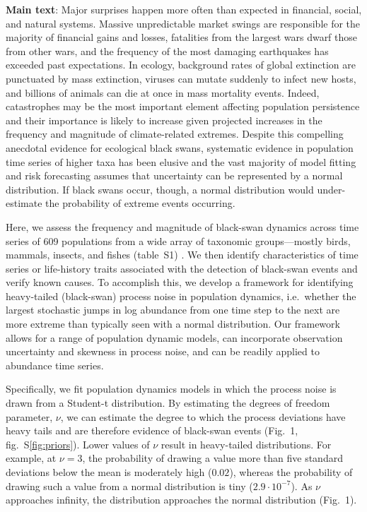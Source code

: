 \textbf{Main text}:
Major surprises happen more often than expected in financial, social, and natural systems\cite{taleb2007, sornette2009, may2008}. Massive unpredictable market swings are responsible for the majority of financial gains and losses\cite{taleb2007}, fatalities from the largest wars dwarf those from other wars\cite{newman2005}, and the frequency of the most damaging earthquakes has exceeded past expectations\cite{sornette2009}. In ecology, background rates of global extinction are punctuated by mass extinction\cite{harnik2012}, viruses can mutate suddenly to infect new hosts, and billions of animals can die at once in mass mortality events\cite{fey2015}. Indeed, catastrophes may be the most important element affecting population persistence\cite{mangel1994} and their importance is likely to increase given projected increases in the frequency and magnitude of climate-related extremes\cite{ipcc2012}. Despite this compelling anecdotal evidence for ecological black swans, systematic evidence in population time series of higher taxa has been elusive\cite{keitt1998, allen2001, halley2002} and the vast majority of model fitting and risk forecasting assumes that uncertainty can be represented by a normal distribution\cite{brook2006a, knape2012}. If black swans occur, though, a normal distribution would under-estimate the probability of extreme events occurring.

Here, we assess the frequency and magnitude of black-swan dynamics across time series of 609 populations from a wide array of taxonomic groups---mostly birds, mammals, insects, and fishes (table~S1) \cite{SOM}. We then identify characteristics of time series or life-history traits associated with the detection of black-swan events and verify known causes. To accomplish this, we develop a framework for identifying heavy-tailed (black-swan) process noise in population dynamics, i.e.~whether the largest stochastic jumps in log abundance from one time step to the next are more extreme than typically seen with a normal distribution. Our framework allows for a range of population dynamic models, can incorporate observation uncertainty and skewness in process noise, and can be readily applied to abundance time series.

Specifically, we fit population dynamics models in which the process noise is drawn from a Student-t distribution. By estimating the degrees of freedom parameter, \(\nu\), we can estimate the degree to which the process deviations have heavy tails and are therefore evidence of black-swan events (Fig.~1, fig.~S\ref{fig:priors}). Lower values of \(\nu\) result in heavy-tailed distributions. For example, at \(\nu = 3\), the probability of drawing a value more than five standard deviations below the mean is moderately high (\(0.02\)), whereas the probability of drawing such a value from a normal distribution is tiny (\(2.9\cdot10^{-7}\)). As \(\nu\) approaches infinity, the distribution approaches the normal distribution (Fig.~1).

